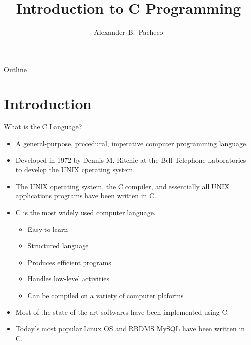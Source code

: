 \documentclass[10pt,t]{beamer}
\title[C]{Introduction to C Programming}
\author[Alex Pacheco]{\large{Alexander~B.~Pacheco}}
\institute[Research Computing]{\href{http://researchcomputing.lehigh.edu}{Research Computing}\\Lehigh University}
\date{}%
\begin{document}
\frame{\titlepage}

\begin{frame}{Outline}
  \tableofcontents
\end{frame}


\section{Introduction}
\begin{frame}{What is the C Language?}
  \begin{itemize}
    \item A general-purpose, procedural, imperative computer programming language.
    \item Developed in 1972 by Dennis M. Ritchie at the Bell Telephone Laboratories to develop the UNIX operating system.
    \item The UNIX operating system, the C compiler, and essentially all UNIX applications programs have been written in C.
    \item C is the most widely used computer language.
    \begin{itemize}
      \item Easy to learn
      \item Structured language
      \item Produces efficient programs
      \item Handles low-level activities
      \item Can be compiled on a variety of computer plaforms
    \end{itemize}
    \item Most of the state-of-the-art softwares have been implemented using C.
    \item Today's most popular Linux OS and RBDMS MySQL have been written in C.
  \end{itemize}
\end{frame}
\end{document}
